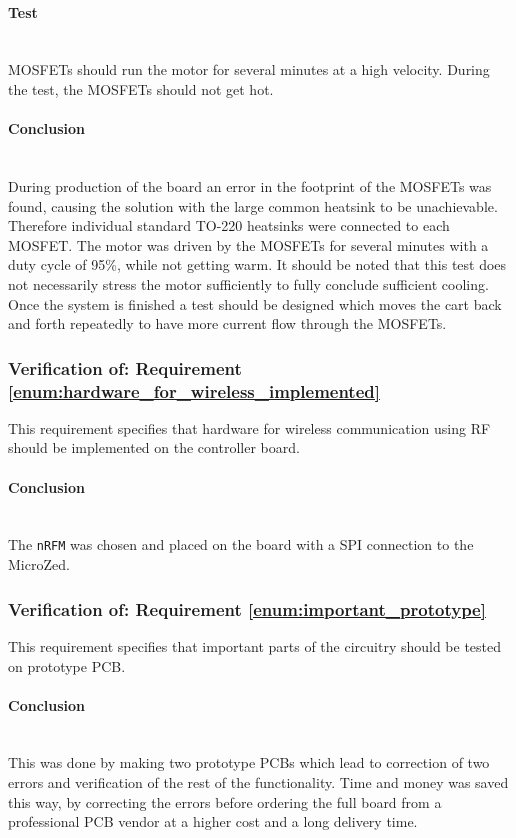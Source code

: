 \paragraph{Test}~\\
MOSFETs should run the motor for several minutes at a high velocity. 
During the test, the MOSFETs should not get hot.

\paragraph{Conclusion}~\\
During production of the board an error in the footprint of the MOSFETs was found, causing the solution with the large common heatsink to be unachievable.
Therefore individual standard TO-220 heatsinks were connected to each MOSFET.
The motor was driven by the MOSFETs for several minutes with a duty cycle of 95\%, while not getting warm.
It should be noted that this test does not necessarily stress the motor sufficiently to fully conclude sufficient cooling.
Once the system is finished a test should be designed which moves the cart back and  forth repeatedly to have more current flow through the MOSFETs.

\subsubsection{Verification of: Requirement \ref{enum:hardware_for_wireless_implemented}} %
\label{ssub:requirement_enum:hardware_for_wireless_implemented}
This requirement specifies that hardware for wireless communication using RF should be implemented on the controller board.

\paragraph{Conclusion}~\\
The \texttt{nRFM} was chosen and placed on the board with a SPI connection to the MicroZed.

\subsubsection{Verification of: Requirement \ref{enum:important_prototype}} %
\label{ssub:requirement_enum:important_prototype}
This requirement specifies that important parts of the circuitry should be tested on prototype PCB.
\paragraph{Conclusion}~\\
This was done by making two prototype PCBs which lead to correction of two errors and verification of the rest of the functionality.
Time and money was saved this way, by correcting the errors before ordering the full board from a professional PCB vendor at a higher cost and a long delivery time.


